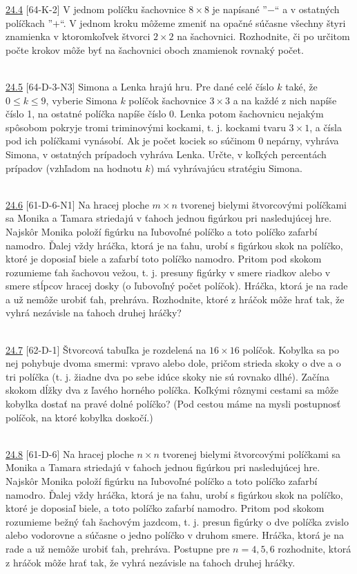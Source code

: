\noindent \ul{24.4} [64-K-2] V jednom políčku šachovnice $8 \times 8$ je napísané ”$-$“ a v ostatných políčkach ”$+$“. V jednom kroku môžeme zmeniť na opačné súčasne všechny štyri znamienka v ktoromkoľvek štvorci $2 \times 2$ na šachovnici. Rozhodnite, či po určitom počte krokov môže byť na šachovnici oboch znamienok rovnaký počet.


\\

\noindent \ul{24.5} [64-D-3-N3] Simona a Lenka hrajú hru. Pre dané celé číslo $k$ také, že $0 \leq k \leq 9$, vyberie Simona $k$ políčok šachovnice $3 \times 3$ a na každé z nich napíše číslo 1, na ostatné políčka napíše číslo 0. Lenka potom šachovnicu nejakým spôsobom pokryje tromi triminovými kockami, t. j. kockami tvaru $3\times1$, a čísla pod ich políčkami vynásobí. Ak je počet kociek so súčinom 0 nepárny, vyhráva Simona, v ostatných prípadoch vyhráva Lenka. Určte, v koľkých percentách prípadov (vzhľadom na hodnotu $k$) má vyhrávajúcu stratégiu Simona.


\\

\noindent \ul{24.6} [61-D-6-N1] Na hracej ploche $m\times n$ tvorenej bielymi štvorcovými políčkami sa Monika a Tamara striedajú v ťahoch jednou figúrkou pri nasledujúcej hre. Najskôr Monika položí figúrku na ľubovoľné políčko a toto políčko zafarbí namodro. Ďalej vždy hráčka, ktorá je na ťahu, urobí s figúrkou skok na políčko, ktoré je doposiaľ biele a zafarbí toto políčko namodro. Pritom pod skokom rozumieme ťah šachovou vežou, t. j. presuny figúrky v smere riadkov alebo v smere stĺpcov hracej dosky (o ľubovoľný počet políčok). Hráčka, ktorá je na rade a už nemôže urobiť ťah, prehráva. Rozhodnite, ktoré z hráčok môže hrať tak, že vyhrá nezávisle na ťahoch druhej hráčky?


\\

\noindent \ul{24.7} [62-D-1]
Štvorcová tabuľka je rozdelená na $16\times16$ políčok. Kobylka sa po nej pohybuje dvoma smermi: vpravo alebo dole, pričom strieda skoky o dve a o tri políčka (t. j. žiadne dva po sebe idúce skoky nie sú rovnako dlhé). Začína skokom dĺžky dva z ľavého horného políčka. Koľkými rôznymi cestami sa môže kobylka dostať na pravé dolné políčko? (Pod cestou máme na mysli postupnosť políčok, na ktoré kobylka doskočí.)


\\

\noindent \ul{24.8} [61-D-6]
Na hracej ploche $n \times n$ tvorenej bielymi štvorcovými políčkami sa Monika a Tamara striedajú v ťahoch jednou figúrkou pri nasledujúcej hre. Najskôr Monika položí figúrku na ľubovoľné políčko a toto políčko zafarbí namodro. Ďalej vždy hráčka, ktorá je na ťahu, urobí s figúrkou skok na políčko, ktoré je doposiaľ biele, a toto políčko zafarbí namodro. Pritom pod skokom rozumieme bežný ťah šachovým jazdcom, t. j. presun figúrky o dve políčka zvislo alebo vodorovne a súčasne o jedno políčko v druhom smere. Hráčka, ktorá je na rade a už nemôže urobiť ťah, prehráva. Postupne pre $n = 4, 5, 6$ rozhodnite, ktorá z hráčok môže hrať tak, že vyhrá nezávisle na ťahoch druhej hráčky.


